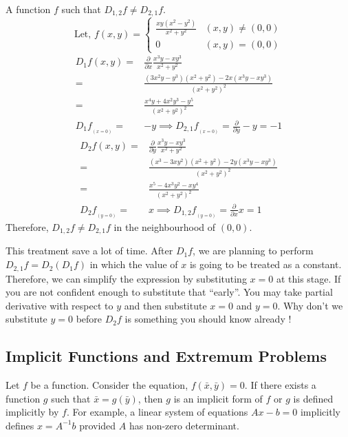 \begin{remark} A function $f$ such that $D_{1,2} f \ne D_{2,1} f$.
\[ \text{Let, }f(x,y) = \begin{cases} \frac{xy(x^2-y^2)}{x^2+y^2} & (x,y) \ne (0,0) \\ 0 & (x,y) = (0,0) \end{cases} \]
\begin{align*}
	D_1 f(x,y) = & \frac{\partial}{\partial x} \frac{x^3y-xy^3}{x^2+y^2} \\
	= & \frac{(3x^2y-y^3)(x^2+y^2) - 2x(x^3y-xy^3)}{(x^2+y^2)^2} \\
	= & \frac{x^4y+4x^2y^3-y^5}{(x^2+y^2)^2}\\
	D_1 f_{_{(x = 0)}} = & -y \implies D_{2,1} f_{_{(x = 0)}} = \frac{\partial}{\partial y} -y = -1
\end{align*}
\begin{align*}
	D_2 f(x,y) = & \frac{\partial}{\partial y} \frac{x^3y-xy^3}{x^2+y^2} \\
	= & \frac{(x^3-3xy^2)(x^2+y^2)-2y(x^3y-xy^3)}{(x^2+y^2)^2} \\
	= & \frac{x^5-4x^3y^2-xy^4}{(x^2+y^2)^2} \\
	D_2 f_{_{(y = 0)}} = & x \implies D_{1,2} f_{_{(y = 0)}}  = \frac{\partial}{\partial x} x = 1
\end{align*}
Therefore, $D_{1,2} f \ne D_{2,1} f$ in the neighbourhood of $(0,0)$.
\begin{commentary} This treatment save a lot of time.
After $D_1 f$, we are planning to perform $D_{2,1} f = D_2 (D_1 f)$ in which the value of $x$ is going to be treated as a constant.
Therefore, we can simplify the expression by substituting $x = 0$ at this stage.
If you are not confident enough to substitute that ``early''.
You may take partial derivative with respect to $y$ and then substitute $x = 0$ and $y = 0$.
Why don't we substitute $y = 0$ before $D_2 f$ is something you should know already !\end{commentary}
\end{remark}

\subsection{Implicit Functions and Extremum Problems}
\begin{definition}
	Let $f$ be a function.
	Consider the equation, $f(\bar{x},\bar{y}) = 0$.
	If there exists a function $g$ such that $\bar{x} = g(\bar{y})$, then $g$ is an implicit form of $f$ or $g$ is defined implicitly by $f$.
	For example, a linear system of equations $Ax-b = 0$ implicitly defines $x = A^{-1}b$ provided $ A$ has non-zero determinant.
\end{definition}


